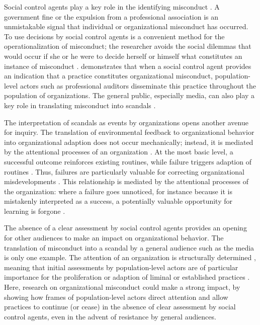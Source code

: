 Social control agents play a key role in the identifying misconduct \citep{Greve2010, Palmer2008, Schnatterly2018}. A government fine or the expulsion from a professional association is an unmistakable signal that individual or organizational misconduct has occurred. To use decisions by social control agents is a convenient method for the operationalization of misconduct; the researcher avoids the social dilemmas that would occur if she or he were to decide herself or himself what constitutes an instance of misconduct \citep[e.g.,][]{Pontikes2010}. \citet{Mohliver2019} demonstrates that when a social control agent provides an indication that a practice constitutes organizational misconduct, population-level actors \citep{Madsen2018} such as professional auditors disseminate this practice throughout the population of organizations. The general public, especially media, can also play a key role in translating misconduct into scandals \citet{Piazza2018, Hoffman1999}.

The interpretation of scandals as events by organizations opens another avenue for inquiry. The translation of environmental feedback to organizational behavior into organizational adaption \citep{Cyert1963} does not occur mechanically; instead, it is mediated by the attentional processes of an organization \citep{Hoffman2001, Ocasio1997}. At the most basic level, a successful outcome reinforces existing routines, while failure triggers adaption of routines \citep{Levitt1988}. Thus, failures are particularly valuable for correcting organizational misdevelopments \citep{March1992}. This relationship is mediated by the attentional processes of the organization: where a failure goes unnoticed, for instance because it is mistakenly interpreted as a success, a potentially valuable opportunity for learning \citep{Carroll1998} is forgone \citep{Dillon2008}.

The absence of a clear assessment by social control agents provides an opening for other audiences to make an impact on organizational behavior. The translation of misconduct into a scandal by a general audience such as the media is only one example. The attention of an organization is structurally determined \citep{Hoffman2001}, meaning that initial assessments by population-level actors are of particular importance for the proliferation or adaption of liminal or established practices \citep{Mohliver2019, Madsen2018}. Here, research on organizational misconduct could make a strong impact, by showing how frames of population-level actors direct attention and allow practices to continue (or cease) in the absence of clear assessment by social control agents, even in the advent of resistance by general audiences.